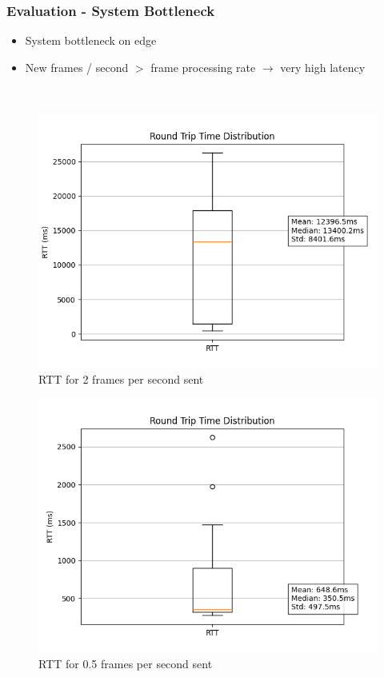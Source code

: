 \documentclass{beamer}
\begin{document}
\begin{frame}
    \frametitle{Evaluation - System Bottleneck}
    \begin{itemize}
        \item System bottleneck on edge
        \item New frames / second $>$ frame processing rate $\rightarrow$ very high latency
    \end{itemize}\
    
\begin{figure}
    \centering
    \begin{minipage}{0.48\textwidth}
        \centering
        \includegraphics[width=\linewidth]{./res/rtt_distribution-local_docker_test20skip.png}
        RTT for 2 frames per second sent
    \end{minipage}
    \hfill
    \begin{minipage}{0.48\textwidth}
        \centering
        \includegraphics[width=\linewidth]{./res/rtt_distribution-docker_test-60skip.png}
        RTT for 0.5 frames per second sent
    \end{minipage}
\end{figure}
\end{frame}
\end{document}
